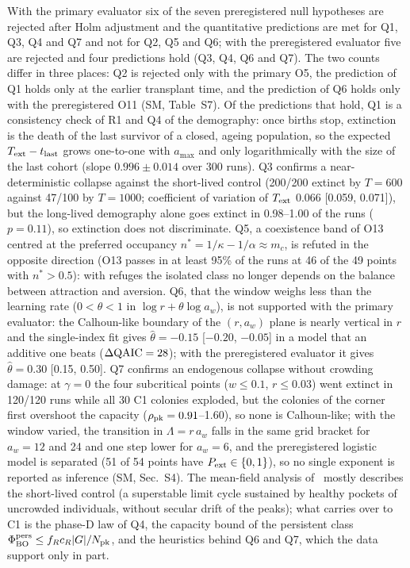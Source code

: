With the primary evaluator six of the seven preregistered null hypotheses are rejected after Holm adjustment and
the quantitative predictions are met for Q1, Q3, Q4 and Q7 and not for Q2, Q5 and Q6; with the preregistered
evaluator five are rejected and four predictions hold (Q3, Q4, Q6 and Q7). The two counts differ in three places:
Q2 is rejected only with the primary O5, the prediction of Q1 holds only at the earlier transplant time, and the
prediction of Q6 holds only with the preregistered O11 (SM, Table~S7). Of the predictions that hold, Q1 is a
consistency check of R1 and Q4 of the demography: once births stop, extinction is the death of the last survivor
of a closed, ageing population, so the expected $T_{\rm ext}-t_{\rm last}$ grows one-to-one with $a_{\max}$ and
only logarithmically with the size of the last cohort (slope $0.996\pm0.014$ over 300 runs). Q3 confirms a
near-deterministic collapse against the short-lived control (200/200 extinct by $T=600$ against 47/100 by $T=1000$; coefficient
of variation of $T_{\rm ext}$ 0.066 [0.059, 0.071]), but the long-lived demography alone goes extinct in 0.98--1.00
of the runs ($p=0.11$), so extinction does not discriminate. Q5, a coexistence band of O13 centred at the
preferred occupancy $n^*=1/\kappa-1/\alpha\approx m_c$, is refuted in the opposite direction (O13 passes in at
least 95\% of the runs at 46 of the 49 points with $n^*>0.5$): with refuges the isolated class no longer depends on
the balance between attraction and aversion. Q6, that the window weighs less than the learning rate ($0<\theta<1$
in $\log r+\theta\log a_w$), is not supported with the primary evaluator: the Calhoun-like boundary of the
$(r,a_w)$ plane is nearly vertical in $r$ and the single-index fit gives $\hat\theta=-0.15$ [$-0.20$, $-0.05$] in a
model that an additive one beats ($\Delta{\rm QAIC}=28$); with the preregistered evaluator it gives $\hat\theta=0.30$
[0.15, 0.50]. Q7 confirms an endogenous collapse without crowding damage: at $\gamma=0$ the four subcritical points
($w\le0.1$, $r\le0.03$) went extinct in 120/120 runs while all 30 \textsf{C1} colonies exploded, but the colonies
of the corner first overshoot the capacity ($\rho_{\rm pk}=0.91$--1.60), so none is Calhoun-like; with the window
varied, the transition in $\Lambda=r\,a_w$ falls in the same grid bracket for $a_w=12$ and 24 and one step lower
for $a_w=6$, and the preregistered logistic model is separated (51 of 54 points have $P_{\rm ext}\in\{0,1\}$), so no
single exponent is reported as inference (SM, Sec.~S4). The mean-field analysis of \extended\ mostly describes the
short-lived control (a superstable limit cycle sustained by healthy pockets of uncrowded individuals, without
secular drift of the peaks); what carries over to \textsf{C1} is the phase-D law of Q4, the capacity bound of the
persistent class $\Phi^{\rm pers}_{\rm BO}\le f_Rc_R|G|/N_{\rm pk}$, and the heuristics behind Q6 and Q7, which the
data support only in part.

